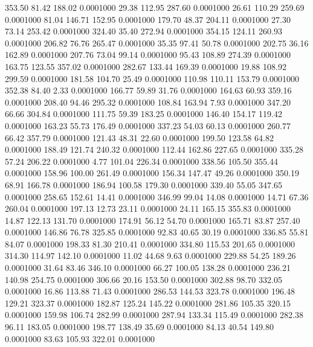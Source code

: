  353.50   81.42  188.02   0.0001000
  29.38  112.95  287.60   0.0001000
  26.61  110.29  259.69   0.0001000
  81.04  146.71  152.95   0.0001000
 179.70   48.37  204.11   0.0001000
  27.30   73.14  253.42   0.0001000
 324.40   35.40  272.94   0.0001000
 354.15  124.11  260.93   0.0001000
 206.82   76.76  265.47   0.0001000
  35.35   97.41   50.78   0.0001000
 202.75   36.16  162.89   0.0001000
 207.76   73.04   99.14   0.0001000
  95.43  108.89  274.39   0.0001000
 163.75  123.55  357.02   0.0001000
 282.67  133.44  169.39   0.0001000
  19.88  108.92  299.59   0.0001000
 181.58  104.70   25.49   0.0001000
 110.98  110.11  153.79   0.0001000
 352.38   84.40    2.33   0.0001000
 166.77   59.89   31.76   0.0001000
 164.63   60.93  359.16   0.0001000
 208.40   94.46  295.32   0.0001000
 108.84  163.94    7.93   0.0001000
 347.20   66.66  304.84   0.0001000
 111.75   59.39  183.25   0.0001000
 146.40  154.17  119.42   0.0001000
 163.23   55.73  176.49   0.0001000
 337.23   54.03   60.13   0.0001000
 260.77   66.42  357.79   0.0001000
 121.43   48.31   22.60   0.0001000
 199.50  123.58   64.82   0.0001000
 188.49  121.74  240.32   0.0001000
 112.44  162.86  227.65   0.0001000
 335.28   57.24  206.22   0.0001000
   4.77  101.04  226.34   0.0001000
 338.56  105.50  355.44   0.0001000
 158.96  100.00  261.49   0.0001000
 156.34  147.47   49.26   0.0001000
 350.19   68.91  166.78   0.0001000
 186.94  100.58  179.30   0.0001000
 339.40   55.05  347.65   0.0001000
 258.65  152.61   14.41   0.0001000
 346.99   99.04   14.08   0.0001000
  14.71   67.36  260.04   0.0001000
 197.13   12.73   23.11   0.0001000
  24.11  165.15  355.83   0.0001000
  14.87  122.13  131.70   0.0001000
 174.91   56.12   54.70   0.0001000
 165.71   83.87  257.40   0.0001000
 146.86   76.78  325.85   0.0001000
  92.83   40.65   30.19   0.0001000
 336.85   55.81   84.07   0.0001000
 198.33   81.30  210.41   0.0001000
 334.80  115.53  201.65   0.0001000
 314.30  114.97  142.10   0.0001000
  11.02   44.68    9.63   0.0001000
 229.88   54.25  189.26   0.0001000
  31.64   83.46  346.10   0.0001000
  66.27  100.05  138.28   0.0001000
 236.21  140.98  254.75   0.0001000
 306.66   20.16  153.50   0.0001000
 302.88   98.70  332.05   0.0001000
  16.86  113.88   71.43   0.0001000
 286.53  144.53  323.78   0.0001000
 196.48  129.21  323.37   0.0001000
 182.87  125.24  145.22   0.0001000
 281.86  105.35  320.15   0.0001000
 159.98  106.74  282.99   0.0001000
 287.94  133.34  115.49   0.0001000
 282.38   96.11  183.05   0.0001000
 198.77  138.49   35.69   0.0001000
  84.13   40.54  149.80   0.0001000
  83.63  105.93  322.01   0.0001000
